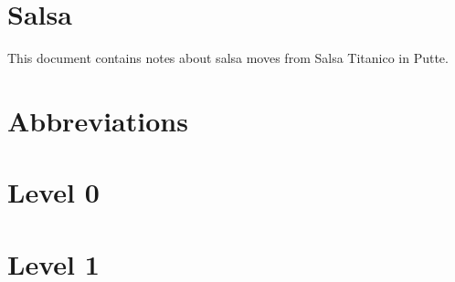 \documentclass[a4paper, 12pt]{article}
\begin{document}




\newpage


\newpage
\setcounter{page}{1}
\tableofcontents

\newpage
\setcounter{page}{1}

\section{Salsa}
\noindent This document contains notes about salsa moves from Salsa Titanico in Putte.

\section{Abbreviations}


\newpage
\section{Level 0}


\newpage
\section{Level 1}

\end{document}
